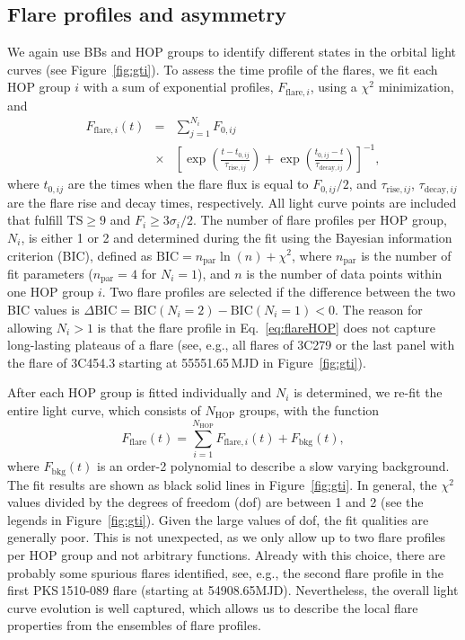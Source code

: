 \documentclass[twocolumn,linenumbers]{aastex62}
\begin{document}
\subsection{Flare profiles and asymmetry}
\label{sec:flare-profile}
We again use BBs and HOP groups to identify different states in 
the orbital light curves (see Figure~\ref{fig:gti}). 
To assess the time profile of the flares,
we fit each HOP group $i$ with a sum of exponential profiles, $F_{\mathrm{flare},i}$,
using a $\chi^2$ minimization, and
\begin{eqnarray}
    F_{\mathrm{flare},i}(t) &=& 
    \sum\limits_{j = 1}^{N_i} F_{0,ij}\nonumber\\
    &\times&\left[\exp\left(\frac{t - t_{0,ij}}{\tau_{\mathrm{rise},ij}}\right) + \exp
    \left(\frac{t_{0,ij} - t}{\tau_{\mathrm{decay},ij}}\right)\right]^{-1}\!\!\!,
    \label{eq:flareHOP}
\end{eqnarray}
where $t_{0,ij}$ are the times when the flare flux is equal to $F_{0,ij} / 2$, and $\tau_{\mathrm{rise},ij}$, $\tau_{\mathrm{decay},ij}$ are the flare rise and decay times, respectively.
All light curve points are included that fulfill $\mathrm{TS}\geqslant9$ and $F_i \geqslant 3\sigma_i/2 $.
The number of flare profiles per HOP group, $N_i$, is either 1 or 2 and determined during the fit using the Bayesian information criterion (BIC), defined as $\mathrm{BIC} = n_\mathrm{par}\ln(n) + \chi^2$, where $n_\mathrm{par}$ is the number of fit parameters ($n_\mathrm{par} = 4$ for $N_i = 1$), and $n$ is the number of data points within one HOP group $i$. 
Two flare profiles are selected if the difference between the two BIC values is $\Delta\mathrm{BIC} = \mathrm{BIC}(N_i = 2) - \mathrm{BIC}(N_i = 1) < 0$.
The reason for allowing $N_i > 1$ is that the flare profile in Eq.~\ref{eq:flareHOP} does not capture long-lasting plateaus of a flare (see, e.g., all flares of 3C279 or the last panel with the flare of 3C454.3 starting at 55551.65\,MJD in Figure~\ref{fig:gti}).

After each HOP group is fitted individually and $N_i$ is determined, 
we re-fit the entire light curve, which consists of $N_\mathrm{HOP}$ groups, with the function 
\begin{equation}
    F_\mathrm{flare}(t) = \sum\limits_{i = 1}^{N_\mathrm{HOP}}F_{\mathrm{flare},i}(t) + F_\mathrm{bkg}(t),
\end{equation}
where $F_\mathrm{bkg}(t)$ is an order-2 polynomial to describe a slow  varying background.
The fit results are shown as black solid lines in Figure~\ref{fig:gti}.
In general, the $\chi^2$ values divided by the degrees of freedom (dof) are between 1 and 2 (see the legends in Figure~\ref{fig:gti}). Given the large values of dof, the fit qualities are generally poor. This is not unexpected, as we only allow up to two flare profiles per HOP group and not arbitrary functions. Already with this choice, there are probably some spurious flares identified, see, e.g., the second flare profile in the first PKS\,1510-089 flare (starting at 54908.65MJD). 
Nevertheless, the overall light curve evolution is well captured, which allows us to describe the local flare properties from the ensembles of flare profiles. %
\end{document}
